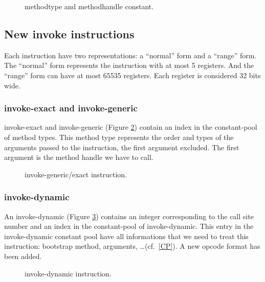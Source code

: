 \documentclass{sig-alternate}
\begin{document}
    \begin{figure}[!h]
      \centering \resizebox{.9\linewidth}{!}{}
      \caption{methodtype and methodhandle constant.}
      \label{MTMHldc}
    \end{figure}

  \subsection{New invoke instructions}
    Each instruction have two representations: a ``normal'' form and a ``range'' form.
    The ``normal'' form represents the instruction with at most 5 registers.
    And the ``range'' form can have at most 65535 registers.
    Each register is considered 32 bits wide.

    \subsubsection{invoke-exact and invoke-generic}

      invoke-exact and invoke-generic (Figure \ref{INGEins}) contain an index in the constant-pool of method types.
      This method type represents the order and types of the arguments passed to the instruction, the first argument excluded.
      The first argument is the method handle we have to call.\\

      \begin{figure}[!h]
        \centering \resizebox{.9\linewidth}{!}{}
        \caption{invoke-generic/exact instruction.}
        \label{INGEins}
      \end{figure}

    \subsubsection{invoke-dynamic}

      An invoke-dynamic (Figure \ref{INDYins}) contains an integer corresponding to the call site number and an index in the constant-pool of invoke-dynamic.
      This entry in the invoke-dynamic constant pool have all informations that we need to treat this instruction: bootstrap method, arguments, \dots (cf.~\ref{CP}).
      A new opcode format has been added.

      \begin{figure}[!h]
        \centering \resizebox{.9\linewidth}{!}{}
        \caption{invoke-dynamic instruction.}
        \label{INDYins}
      \end{figure}
\end{document}
